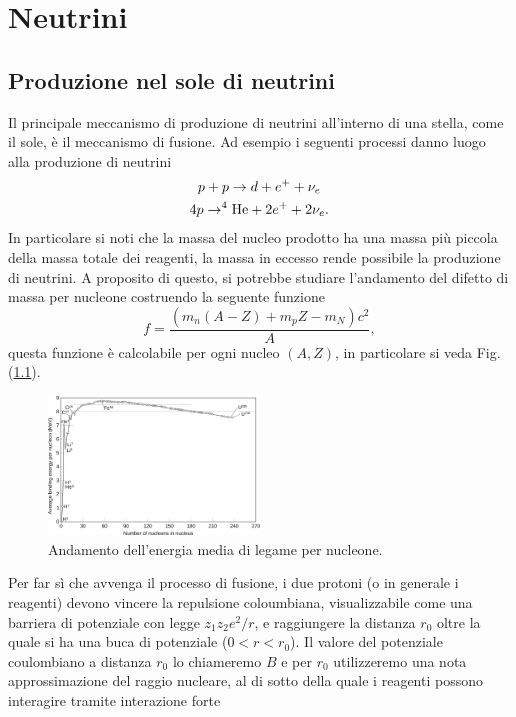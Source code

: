 \chapterspaceabove{6.75cm} %
\chapterspacebelow{7.25cm} %


\chapter{Neutrini}

\section{Produzione nel sole di neutrini}
Il principale meccanismo di produzione di neutrini all'interno di una stella, come il sole, è il meccanismo di fusione. Ad esempio i seguenti processi danno luogo alla produzione di neutrini
\begin{gather*}
    p + p \rightarrow d + e^+ + \nu_e \\
    4p \rightarrow ^4\textup{He} + 2e^+ + 2\nu_e.
\end{gather*}
In particolare si noti che la massa del nucleo prodotto ha una massa più piccola della massa totale dei reagenti, la massa in eccesso rende possibile la produzione di neutrini. A proposito di questo, si potrebbe studiare l'andamento del difetto di massa per nucleone costruendo la seguente funzione
\begin{equation*}
    f = \frac{(m_n(A-Z) + m_p Z - m_N)c^2}{A},
\end{equation*}
questa funzione è calcolabile per ogni nucleo $(A, Z)$, in particolare si veda Fig.(\ref{fig:nuclei}).
\begin{figure}[H]
    \centering
    \includegraphics[width=0.5\textwidth]{img/nuclei.png}
    \caption{Andamento dell'energia media di legame per nucleone.}
    \label{fig:nuclei}
\end{figure}
Per far sì che avvenga il processo di fusione, i due protoni (o in generale i reagenti) devono vincere la repulsione coloumbiana, visualizzabile come una barriera di potenziale con legge $z_1 z_2 e^2 / r$, e raggiungere la distanza $r_0$ oltre la quale si ha una buca di potenziale ($0 < r < r_0$). Il valore del potenziale coulombiano a distanza $r_0$ lo chiameremo $B$ e per $r_0$ utilizzeremo una nota approssimazione del raggio nucleare, al di sotto della quale i reagenti possono interagire tramite interazione forte
